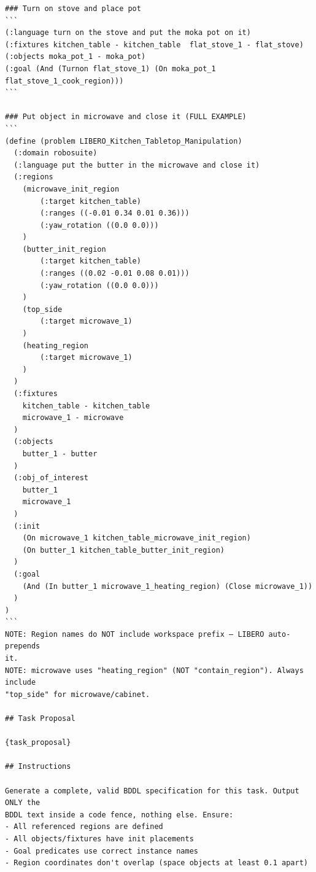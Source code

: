 \begin{lstlisting}[style=ratsappendixprompt]
### Turn on stove and place pot
```
(:language turn on the stove and put the moka pot on it)
(:fixtures kitchen_table - kitchen_table  flat_stove_1 - flat_stove)
(:objects moka_pot_1 - moka_pot)
(:goal (And (Turnon flat_stove_1) (On moka_pot_1 flat_stove_1_cook_region)))
```

### Put object in microwave and close it (FULL EXAMPLE)
```
(define (problem LIBERO_Kitchen_Tabletop_Manipulation)
  (:domain robosuite)
  (:language put the butter in the microwave and close it)
  (:regions
    (microwave_init_region
        (:target kitchen_table)
        (:ranges ((-0.01 0.34 0.01 0.36)))
        (:yaw_rotation ((0.0 0.0)))
    )
    (butter_init_region
        (:target kitchen_table)
        (:ranges ((0.02 -0.01 0.08 0.01)))
        (:yaw_rotation ((0.0 0.0)))
    )
    (top_side
        (:target microwave_1)
    )
    (heating_region
        (:target microwave_1)
    )
  )
  (:fixtures
    kitchen_table - kitchen_table
    microwave_1 - microwave
  )
  (:objects
    butter_1 - butter
  )
  (:obj_of_interest
    butter_1
    microwave_1
  )
  (:init
    (On microwave_1 kitchen_table_microwave_init_region)
    (On butter_1 kitchen_table_butter_init_region)
  )
  (:goal
    (And (In butter_1 microwave_1_heating_region) (Close microwave_1))
  )
)
```
NOTE: Region names do NOT include workspace prefix — LIBERO auto-prepends
it.
NOTE: microwave uses "heating_region" (NOT "contain_region"). Always include
"top_side" for microwave/cabinet.

## Task Proposal

{task_proposal}

## Instructions

Generate a complete, valid BDDL specification for this task. Output ONLY the
BDDL text inside a code fence, nothing else. Ensure:
- All referenced regions are defined
- All objects/fixtures have init placements
- Goal predicates use correct instance names
- Region coordinates don't overlap (space objects at least 0.1 apart)
\end{lstlisting}

